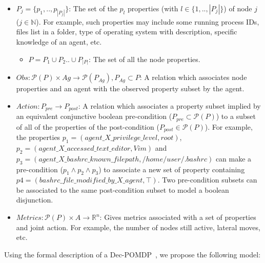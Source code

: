 \documentclass[conference]{IEEEtran}
\begin{document}
\begin{itemize}
    \item $P_{j} = \{ p_1, .., p_{|P_{j}|} \}$: The set of the $p_{l}$ properties (with $l \in \{1,..,|P_{j}|\}$) of node $j$ ($j \in \mathbb{N} $). For example, such properties may include some running process IDs, files list in a folder, type of operating system with description, specific knowledge of an agent, etc.
    \begin{itemize}
        \item $P = P_1 \cup P_2 .. \cup P_{|P|} $: The set of all the node properties.
    \end{itemize}

    \item $Obs: \mathcal{P}(P) \times Ag \rightarrow \mathcal{P}(P_{Ag}), P_{Ag} \subset P$: A relation which associates node properties and an agent with the observed property subset by the agent.
    
    \item $Action: P_{pre} \rightarrow P_{post}$: A relation which associates a property subset implied by an equivalent conjunctive boolean pre-condition ($P_{pre} \subset \mathcal{P}(P)$) to a subset of all of the properties of the post-condition ($P_{post} \in \mathcal{P}(P)$). For example, the properties $p_1 = (agent\_X\_privilege\_level, \allowbreak root)$, $p_2 = (agent\_X\_accessed\_text\_editor, \allowbreak Vim)$ and $p_3 = (agent\_X\_bashrc\_known\_filepath, \allowbreak /home/user/.bashrc)$ can make a pre-condition ($p_1 \land p_2 \land p_3$) to associate a new set of property containing $p4 = (bashrc\_file\_modified\_by\_X\_agent, \top)$. Two pre-condition subsets can be associated to the same post-condition subset to model a boolean disjunction.

    \item $Metrics: \mathcal{P}(P) \times A \rightarrow \mathbb{R}^{n}$: Gives metrics associated with a set of properties and joint action. For example, the number of nodes still active, lateral moves, etc.

\end{itemize}


Using the formal description of a Dec-POMDP~\cite{OliehoekA16}, we propose the following model:
\end{document}
